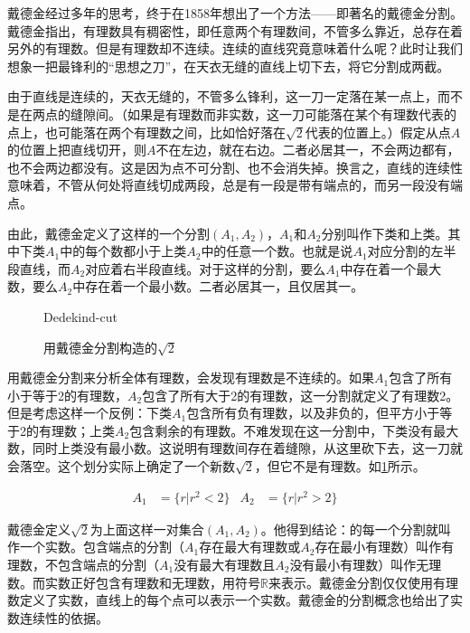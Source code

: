 \documentclass[b5paper]{ctexart}
\begin{document}
戴德金经过多年的思考，终于在1858年想出了一个方法——即著名的戴德金分割。戴德金指出，有理数具有稠密性，即任意两个有理数间，不管多么靠近，总存在着另外的有理数。但是有理数却不连续。连续的直线究竟意味着什么呢？此时让我们想象一把最锋利的“思想之刀”，在天衣无缝的直线上切下去，将它分割成两截。

由于直线是连续的，天衣无缝的，不管多么锋利，这一刀一定落在某一点上，而不是在两点的缝隙间。（如果是有理数而非实数，这一刀可能落在某个有理数代表的点上，也可能落在两个有理数之间，比如恰好落在$\sqrt{2}$代表的位置上。）假定从点$A$的位置上把直线切开，则$A$不在左边，就在右边。二者必居其一，不会两边都有，也不会两边都没有。这是因为点不可分割、也不会消失掉。换言之，直线的连续性意味着，不管从何处将直线切成两段，总是有一段是带有端点的，而另一段没有端点。

由此，戴德金定义了这样的一个分割$(A_1, A_2)$，$A_1$和$A_2$分别叫作下类和上类。其中下类$A_1$中的每个数都小于上类$A_2$中的任意一个数。也就是说$A_1$对应分割的左半段直线，而$A_2$对应着右半段直线。对于这样的分割，要么$A_1$中存在着一个最大数，要么$A_2$中存在着一个最小数。二者必居其一，且仅居其一。

\begin{figure}[htbp]
 \centering
 {Dedekind-cut}
 \caption{用戴德金分割构造的$\sqrt{2}$}
 \label{fig:Dedekind-cut}
\end{figure}

用戴德金分割来分析全体有理数，会发现有理数是不连续的。如果$A_1$包含了所有小于等于2的有理数，$A_2$包含了所有大于2的有理数，这一分割就定义了有理数2。但是考虑这样一个反例：下类$A_1$包含所有负有理数，以及非负的，但平方小于等于2的有理数；上类$A_2$包含剩余的有理数。不难发现在这一分割中，下类没有最大数，同时上类没有最小数。这说明有理数间存在着缝隙，从这里砍下去，这一刀就会落空。这个划分实际上确定了一个新数$\sqrt{2}$，但它不是有理数。如\cref{fig:Dedekind-cut}所示。

\begin{align*}
A_1 &= \{r | r^2 < 2\}  & A_2 &= \{r | r^2 > 2\}
\end{align*}

\label{sec:Dedekind-cut}
戴德金定义$\sqrt{2}$为上面这样一对集合$(A_1, A_2)$。他得到结论：的每一个分割就叫作一个实数。包含端点的分割（$A_1$存在最大有理数或$A_2$存在最小有理数）叫作有理数，不包含端点的分割（$A_1$没有最大有理数且$A_2$没有最小有理数）叫作无理数。而实数正好包含有理数和无理数，用符号$\mathbb{R}$来表示。戴德金分割仅仅使用有理数定义了实数，直线上的每个点可以表示一个实数。戴德金的分割概念也给出了实数连续性的依据。
\end{document}
